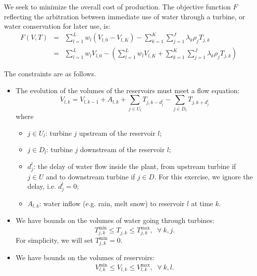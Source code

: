 \documentclass[11pt]{article}
\begin{document}
We seek to minimize the overall cost of production. The objective function $F$ reflecting the arbitration between immediate use of water through a turbine, or water conservation for later use, is:
\begin{align*}
F(V,T) &=& \sum_{l=1}^{L} w_l(V_{l,0} - V_{l,K}) - \sum_{k=1}^{K}\sum_{j=1}^{J} \lambda_k \rho_{j}T_{j,k}
\\
&=&  \sum_{l=1}^{L} w_lV_{l,0}  - \left( \sum_{l=1}^{L} w_lV_{l,K} + \sum_{k=1}^{K}\sum_{j=1}^{J} \lambda_k \rho_{j}T_{j,k}\right)
\end{align*}

The constraints are as follows.
\begin{itemize}
\item The evolution of the volumes of the reservoirs must meet a flow equation:
\[
V_{l,k} = V_{l,k-1} + A_{l,k} + \sum_{j \in U_l} T_{j,k - d_{j}^l} - \sum_{j \in D_l} T_{j,k + d_{j}^l}
\]
where
\begin{itemize}
\item $j \in U_l$: turbine $j$ upstream of the reservoir $l$;
\item $j \in D_l$: turbine $j$ downstream of the reservoir $l$;
\item $d_{j}^{l}$: the delay of water flow inside the plant, from upstream turbine if $j \in U$ and to downstream turbine if $j \in D$. For this exercise, we ignore the delay, i.e. $d_{j}^{l} = 0$;
\item $A_{l,k}$:  water inflow (e.g. rain, melt snow) to reservoir $l$ at time $k$.
\end{itemize}

\item We have bounds on the volumes of water going through turbines:
\[
T_{j,k}^{\min} \le T_{j,k} \le T_{j,k}^{\max}, \;\; \forall \: k, j.
\]
For simplicity, we will set $T_{j,k}^{\min} = 0$.

\item We have bounds on the volumes of reservoirs:
\[
V_{l,k}^{\min} \le V_{l,k} \le V_{l, k}^{\max}, \;\; \forall \: k, l.
\]
\end{itemize}
\end{document}
